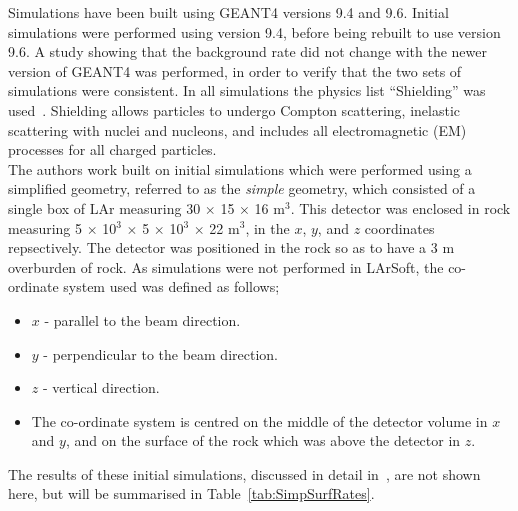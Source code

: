 Simulations have been built using GEANT4 versions 9.4 and 9.6. Initial simulations were performed using version 9.4, before being rebuilt to use version 9.6. A study showing that the background rate did not change with the newer version of GEANT4 was performed, in order to verify that the two sets of simulations were consistent. In all simulations the physics list ``Shielding'' was used~\citep{Shielding}. Shielding allows particles to undergo Compton scattering, inelastic scattering with nuclei and nucleons, and includes all electromagnetic (EM) processes for all charged particles. \\

The authors work built on initial simulations which were performed using a simplified geometry, referred to as the \emph{simple} geometry, which consisted of a single box of LAr measuring 30 $\times$ 15 $\times$ 16 m$^3$. This detector was enclosed in rock measuring 5 $\times$ 10$^3$ $\times$ 5 $\times$ 10$^3$ $\times$ 22 m$^{3}$, in the $x$, $y$, and $z$ coordinates repsectively. The detector was positioned in the rock so as to have a 3 m overburden of rock. As simulations were not performed in LArSoft, the co-ordinate system used was defined as follows;
\begin{itemize}
\item $x$ - parallel to the beam direction.
\item $y$ - perpendicular to the beam direction.
\item $z$ - vertical direction.
\item The co-ordinate system is centred on the middle of the detector volume in $x$ and $y$, and on the surface of the rock which was above the detector in $z$.
\end{itemize}
The results of these initial simulations, discussed in detail in~\citep{MartinsThesis}, are not shown here, but will be summarised in Table~\ref{tab:SimpSurfRates}. \\

